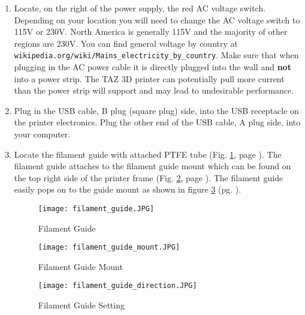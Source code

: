 \begin{enumerate}
\item Locate, on the right of the power supply, the red AC voltage switch. Depending on your location you will need to change the AC voltage switch to 115V or 230V. North America is generally 115V and the majority of other regions are 230V. You can find general voltage by country at \texttt{wikipedia.org/wiki/Mains\_electricity\_by\_country}. Make sure that when plugging in the AC power cable it is directly plugged into the wall and \textbf{not} into a power strip. The TAZ 3D printer can potentially pull more current than the power strip will support and may lead to undesirable performance. 

\item Plug in the USB cable, B plug (square plug) side, into the USB receptacle on the printer electronics. Plug the other end of the USB cable, A plug side, into your computer.

\item Locate the filament guide with attached PTFE tube
(Fig. \ref{fig:filament_guide}, page \pageref{fig:filament_guide}). The filament guide attaches to the filament guide mount which can be found on the top right side of the printer frame (Fig. \ref{fig:filament_guide_mount}, page \pageref{fig:filament_guide_mount}). The filament guide easily pops on to the guide mount as shown in figure \ref{fig:filament_guide_setting} (pg. \pageref{fig:filament_guide_setting}).
\begin{figure}[H]
\centering
\texttt{[image: filament\_guide.JPG]}
\caption{Filament Guide}
\label{fig:filament_guide}
\end{figure}

\begin{figure}[H]
\centering
\texttt{[image: filament\_guide\_mount.JPG]}
\caption{Filament Guide Mount}
\label{fig:filament_guide_mount}
\end{figure}

\begin{figure}[H]
\centering
\texttt{[image: filament\_guide\_direction.JPG]}
\caption{Filament Guide Setting}
\label{fig:filament_guide_setting}
\end{figure}


\end{enumerate}
